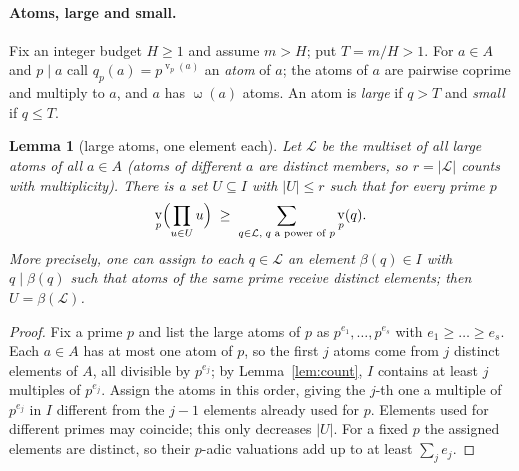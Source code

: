 \documentclass[11pt]{article}
\newtheorem{lemma}[theorem]{Lemma}
\theoremstyle{definition}
\DeclareMathOperator{\vp}{v}
\DeclareMathOperator{\om}{\omega}
\begin{document}
\paragraph{Atoms, large and small.}
Fix an integer budget $H\ge 1$ and assume $m>H$; put $T=m/H>1$. For $a\in A$ and $p\mid a$ call
$q_p(a)=p^{\vp_p(a)}$ an \emph{atom} of $a$; the atoms of $a$ are pairwise coprime and multiply to $a$, and
$a$ has $\om(a)$ atoms. An atom is \emph{large} if $q>T$ and \emph{small} if $q\le T$.

\begin{lemma}[large atoms, one element each]\label{lem:large}
Let $\mathcal L$ be the multiset of all large atoms of all $a\in A$ (atoms of different $a$ are distinct
members, so $r=|\mathcal L|$ counts with multiplicity). There is a \emph{set} $U\subseteq I$ with $|U|\le r$
such that for every prime $p$
\[
 \vp_p\Bigl(\prod_{u\in U}u\Bigr)\;\ge\;\sum_{q\in\mathcal L,\;q\text{ a power of }p}\vp_p(q).
\]
More precisely, one can assign to each $q\in\mathcal L$ an element $\beta(q)\in I$ with $q\mid\beta(q)$ such
that atoms of the same prime receive distinct elements; then $U=\beta(\mathcal L)$.
\end{lemma}
\begin{proof}
Fix a prime $p$ and list the large atoms of $p$ as $p^{e_1},\dots,p^{e_s}$ with $e_1\ge\dots\ge e_s$. Each
$a\in A$ has at most one atom of $p$, so the first $j$ atoms come from $j$ distinct elements of $A$, all
divisible by $p^{e_j}$; by Lemma~\ref{lem:count}, $I$ contains at least $j$ multiples of $p^{e_j}$. Assign the
atoms in this order, giving the $j$-th one a multiple of $p^{e_j}$ in $I$ different from the $j-1$ elements
already used for $p$. Elements used for different primes may coincide; this only decreases $|U|$. For a
fixed $p$ the assigned elements are distinct, so their $p$-adic valuations add up to at least $\sum_j e_j$.
\end{proof}
\end{document}
